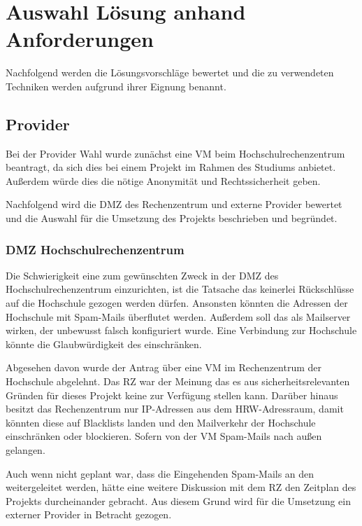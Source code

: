 \documentclass[a4paper,11pt,singlespacing]{article}
\begin{document}
\newpage


\section{Auswahl Lösung anhand Anforderungen}\label{sec:AuswahlLösungAnhandAnforderungen}
	Nachfolgend werden die Lösungsvorschläge bewertet und die zu verwendeten Techniken werden aufgrund ihrer Eignung benannt.
	\subsection{Provider}\label{sec:AuswahlLösungProvider}
		Bei der Provider Wahl wurde zunächst eine VM beim Hochschulrechenzentrum  beantragt, da sich dies bei einem Projekt im Rahmen des Studiums anbietet. Außerdem würde dies die nötige Anonymität und Rechtssicherheit geben.
		
		Nachfolgend wird die DMZ des Rechenzentrum und externe Provider bewertet und die Auswahl für die Umsetzung des Projekts beschrieben und begründet.
		
		\subsubsection{DMZ Hochschulrechenzentrum}\label{sec:AuswahlLösungDMZHochschulrechenzentrum}
			Die Schwierigkeit eine  zum gewünschten Zweck in der DMZ des Hochschulrechenzentrum einzurichten, ist die Tatsache das keinerlei Rückschlüsse auf die Hochschule gezogen werden dürfen. Ansonsten könnten die Adressen der Hochschule mit Spam-Mails überflutet werden. Außerdem soll das  als Mailserver wirken, der unbewusst falsch konfiguriert wurde. Eine Verbindung zur Hochschule könnte die Glaubwürdigkeit des  einschränken.
			
			Abgesehen davon wurde der Antrag über eine VM im Rechenzentrum der Hochschule abgelehnt. Das RZ war der Meinung das es aus sicherheitsrelevanten Gründen für dieses Projekt keine  zur Verfügung stellen kann. Darüber hinaus besitzt das Rechenzentrum nur IP-Adressen aus dem HRW-Adressraum, damit könnten diese auf Blacklists landen und den Mailverkehr der Hochschule einschränken oder blockieren. Sofern von der VM Spam-Mails nach außen gelangen.
			
			Auch wenn nicht geplant war, dass die Eingehenden Spam-Mails an den  weitergeleitet werden, hätte eine weitere Diskussion mit dem RZ den Zeitplan des Projekts durcheinander gebracht. Aus diesem Grund wird für die Umsetzung ein externer Provider in Betracht gezogen.
		
\end{document}
